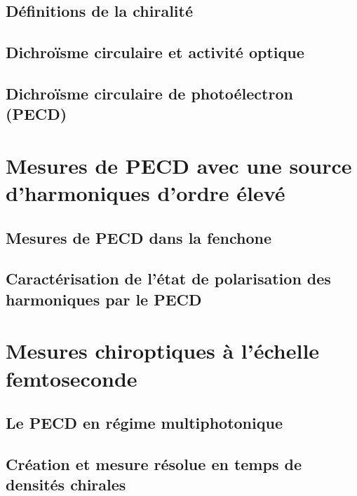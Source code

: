\section{Définitions de la chiralité}
\section{Dichroïsme circulaire et activité optique}
\section{Dichroïsme circulaire de photoélectron (PECD)}

\chapter{Mesures de PECD avec une source d'harmoniques d'ordre élevé}
\section{Mesures de PECD dans la fenchone}
\section{Caractérisation de l'état de polarisation des harmoniques par le PECD}

\chapter{Mesures chiroptiques à l'échelle femtoseconde}
\section{Le PECD en régime multiphotonique}
\section{Création et mesure résolue en temps de densités chirales}